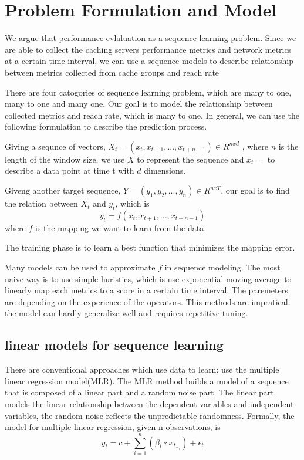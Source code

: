 \documentclass[5p]{elsarticle}
\newcommand{\dabiaolv}{reach rate}
\begin{document}
\section{Problem Formulation and Model}
We argue that performance evlaluation as a sequence learning problem. Since we are able to collect the caching servers performance metrics and network metrics at a certain time interval, we can use a sequence models to describe relationship between metrics collected from  cache groups and \dabiaolv

There are four catogories of sequence learning problem, which are many to one, many to one and many one. Our goal is to model the relationship between collected metrics and \dabiaolv, which is many to one. In general, we can use the following formulation to describe the prediction process.

Giving a sequnce of vectors, $X_t=(x_t,x_{t+1},...,x_{t+n-1}) \in R^{nxd}$ , where $n$ is the length of the window size, we use $X$ to represent the sequence and $x_t=$ to describe a data point at time t with $d$ dimensions.

Giveng another target sequence, $Y=(y_1,y_2,...,y_n) \in R^{nxT}$, our goal is to find the relation between $X_t$ and $y_t$, which is 
$$y_t=f(x_t,x_{t+1},...,x_{t+n-1})$$
where $f$ is the mapping we want to learn from the data.

The training phase is to learn a best function that minimizes the mapping error.

Many models can be used to approximate $f$ in sequence modeling. The most naive way is to use simple huristics, which is use exponential moving average to linearly map each metrics to a score in a certain time interval. The paremeters are depending on the experience of the operators. This methods are impratical: the model can hardly generalize well and requires repetitive tuning.

\subsection{linear models for sequence learning}

There are conventional approaches which use data to learn: use the multiple linear regression model(MLR). The MLR method builds a model of a sequence that is composed of a linear part and a random noise part. The linear part models the linear relationship between the dependent variables and independent variables, the random noise reflects the unpredictable randomness. Formally, the model for multiple linear regression, given n observations, is 
    $$y_t = c+\sum_{i=1}^{n}(\beta_i ∗ x_{t_−_i})+\epsilon_t$$
\end{document}
